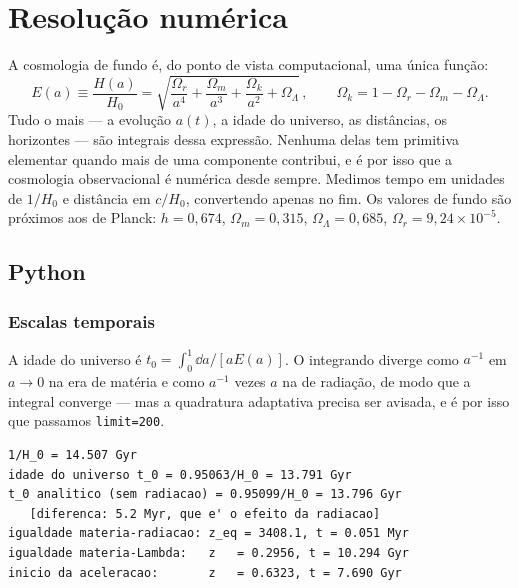 \section{Resolução numérica}
\label{sec:cap13-numerica}

A cosmologia de fundo é, do ponto de vista computacional, uma única função:
\begin{equation}
  E(a) \equiv \frac{H(a)}{H_{0}}
  = \sqrt{\frac{\Omega_{r}}{a^{4}} + \frac{\Omega_{m}}{a^{3}}
          + \frac{\Omega_{k}}{a^{2}} + \Omega_{\Lambda}}\,,
  \qquad
  \Omega_{k} = 1 - \Omega_{r} - \Omega_{m} - \Omega_{\Lambda}.
  \label{eq:cap13-E}
\end{equation}
Tudo o mais --- a evolução $a(t)$, a idade do universo, as distâncias, os
horizontes --- são integrais dessa expressão. Nenhuma delas tem primitiva
elementar quando mais de uma componente contribui, e é por isso que a
cosmologia observacional é numérica desde sempre. Medimos tempo em unidades
de $1/H_{0}$ e distância em $c/H_{0}$, convertendo apenas no fim. Os valores
de fundo são próximos aos de Planck: $h = 0{,}674$, $\Omega_{m} = 0{,}315$,
$\Omega_{\Lambda} = 0{,}685$, $\Omega_{r} = 9{,}24\times 10^{-5}$.

\subsection{Python}


\subsubsection*{Escalas temporais}

A idade do universo é $t_{0} = \int_{0}^{1} \dd a/[a E(a)]$. O integrando
diverge como $a^{-1}$ em $a \to 0$ na era de matéria e como $a^{-1}$ vezes
$a$ na de radiação, de modo que a integral converge --- mas a quadratura
adaptativa precisa ser avisada, e é por isso que passamos \texttt{limit=200}.

\begin{saida}
\begin{lstlisting}[style=rgsaida]
1/H_0 = 14.507 Gyr
idade do universo t_0 = 0.95063/H_0 = 13.791 Gyr
t_0 analitico (sem radiacao) = 0.95099/H_0 = 13.796 Gyr
   [diferenca: 5.2 Myr, que e' o efeito da radiacao]
igualdade materia-radiacao: z_eq = 3408.1, t = 0.051 Myr
igualdade materia-Lambda:   z   = 0.2956, t = 10.294 Gyr
inicio da aceleracao:       z   = 0.6323, t = 7.690 Gyr
\end{lstlisting}
\end{saida}


